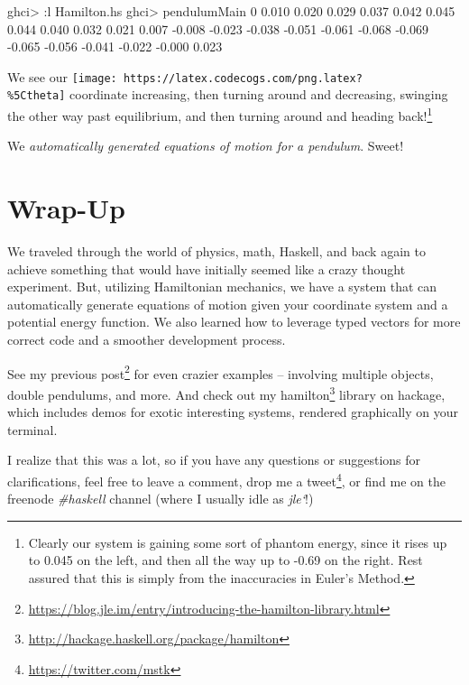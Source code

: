 \documentclass[]{article}
\newenvironment{Shaded}{}{}
\newcommand{\DecValTok}[1]{\textcolor[rgb]{0.25,0.63,0.44}{#1}}
\newcommand{\FloatTok}[1]{\textcolor[rgb]{0.25,0.63,0.44}{#1}}
\newcommand{\FunctionTok}[1]{\textcolor[rgb]{0.02,0.16,0.49}{#1}}
\newcommand{\NormalTok}[1]{#1}
\renewcommand{\href}[2]{#2\footnote{\url{#1}}}
\begin{document}
\begin{Shaded}
\begin{Highlighting}[]
\NormalTok{ghci}\FunctionTok{>} \FunctionTok{:}\NormalTok{l Hamilton.hs}
\NormalTok{ghci}\FunctionTok{>}\NormalTok{ pendulumMain}
\DecValTok{0}
\FloatTok{0.010}
\FloatTok{0.020}
\FloatTok{0.029}
\FloatTok{0.037}
\FloatTok{0.042}
\FloatTok{0.045}
\FloatTok{0.044}
\FloatTok{0.040}
\FloatTok{0.032}
\FloatTok{0.021}
\FloatTok{0.007}
\FunctionTok{-}\FloatTok{0.008}
\FunctionTok{-}\FloatTok{0.023}
\FunctionTok{-}\FloatTok{0.038}
\FunctionTok{-}\FloatTok{0.051}
\FunctionTok{-}\FloatTok{0.061}
\FunctionTok{-}\FloatTok{0.068}
\FunctionTok{-}\FloatTok{0.069}
\FunctionTok{-}\FloatTok{0.065}
\FunctionTok{-}\FloatTok{0.056}
\FunctionTok{-}\FloatTok{0.041}
\FunctionTok{-}\FloatTok{0.022}
\FunctionTok{-}\FloatTok{0.000}
\FloatTok{0.023}
\end{Highlighting}
\end{Shaded}

We see our \texttt{[image: https://latex.codecogs.com/png.latex?\\\%5Ctheta]}
coordinate increasing, then turning around and decreasing, swinging the other
way past equilibrium, and then turning around and heading back!\footnote{Clearly
  our system is gaining some sort of phantom energy, since it rises up to 0.045
  on the left, and then all the way up to -0.69 on the right. Rest assured that
  this is simply from the inaccuracies in Euler's Method.}

We \emph{automatically generated equations of motion for a pendulum}. Sweet!

\section{Wrap-Up}\label{wrap-up}

We traveled through the world of physics, math, Haskell, and back again to
achieve something that would have initially seemed like a crazy thought
experiment. But, utilizing Hamiltonian mechanics, we have a system that can
automatically generate equations of motion given your coordinate system and a
potential energy function. We also learned how to leverage typed vectors for
more correct code and a smoother development process.

See my
\href{https://blog.jle.im/entry/introducing-the-hamilton-library.html}{previous
post} for even crazier examples -- involving multiple objects, double pendulums,
and more. And check out my
\href{http://hackage.haskell.org/package/hamilton}{hamilton} library on hackage,
which includes demos for exotic interesting systems, rendered graphically on
your terminal.

I realize that this was a lot, so if you have any questions or suggestions for
clarifications, feel free to leave a comment, drop me a
\href{https://twitter.com/mstk}{tweet}, or find me on the freenode
\emph{\#haskell} channel (where I usually idle as \emph{jle`}!)
\end{document}
